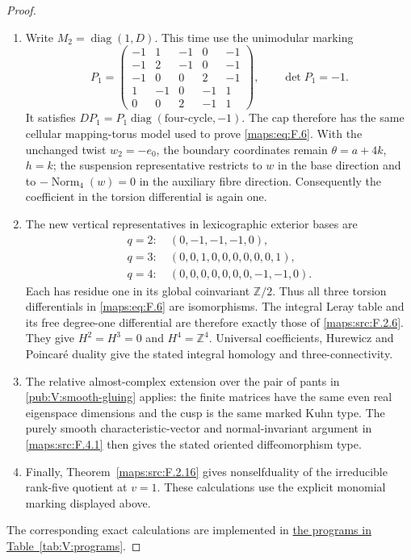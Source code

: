 \documentclass[11pt,a4paper]{article}
\numberwithin{equation}{section}
\theoremstyle{definition}
\begin{document}
\begin{proof}
\begin{enumerate}[label=\arabic*.]
\item Write $M_2=\operatorname{diag}(1,D)$.  This time use the
unimodular marking
\[
 P_1=\begin{pmatrix}
 -1&1&-1&0&-1\\
 -1&2&-1&0&-1\\
 -1&0&0&2&-1\\
 1&-1&0&-1&1\\
 0&0&2&-1&1
 \end{pmatrix},\qquad \det P_1=-1.
\]
It satisfies $DP_1=P_1\operatorname{diag}(\text{four-cycle},-1)$.
The cap therefore has the same cellular mapping-torus model
used to prove \eqref{maps:eq:F.6}.  With the unchanged twist $w_2=-e_0$,
the boundary coordinates remain $\theta=a+4k$, $h=k$;
the suspension representative restricts to $w$ in the base
direction and to $-\operatorname{Norm}_4(w)=0$ in the
auxiliary fibre direction.  Consequently the coefficient in
the torsion differential is again one.

\item The new vertical representatives in lexicographic exterior
bases are
\[
\begin{split}
 q=2:\ &(0,-1,-1,-1,0),\\
 q=3:\ &(0,0,1,0,0,0,0,0,0,1),\\
 q=4:\ &(0,0,0,0,0,0,0,-1,-1,0).
\end{split}
\]
Each has residue one in its global coinvariant
$\mathbb Z/2$.  Thus all three torsion differentials in \eqref{maps:eq:F.6}
are isomorphisms.  The integral Leray table and its free
degree-one differential are therefore exactly those of
\ref{maps:src:F.2.6}.  They give $H^2=H^3=0$ and $H^4=\mathbb Z^4$.
Universal coefficients, Hurewicz and Poincar\'e duality give
the stated integral homology and three-connectivity.

\item The relative almost-complex extension over the pair of pants
in \cref{pub:V:smooth-gluing} applies: the finite matrices have the same even
real eigenspace dimensions and the cusp is the same marked
Kuhn type.  The purely smooth characteristic-vector and
normal-invariant argument in \ref{maps:src:F.4.1} then gives the stated
oriented diffeomorphism type.

\item Finally, Theorem~\ref{maps:src:F.2.16} gives nonselfduality of the irreducible rank-five quotient at $v=1$.
These calculations use the explicit monomial marking displayed above.

\end{enumerate}
The corresponding exact calculations are implemented in \hyperlink{prog:V:second-pair}{the programs in Table~\ref*{tab:V:programs}}.
\end{proof}
\end{document}
